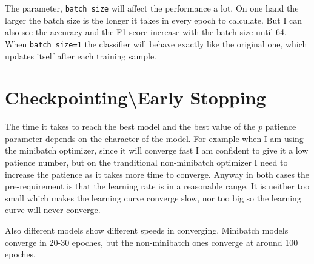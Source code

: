 \documentclass[11pt]{article} %
\begin{document}
The parameter, \verb|batch_size| will affect the performance a lot. On one hand the larger the batch size is the longer it takes in every epoch to calculate. But I can also see the accuracy and the F1-score increase with the batch size until 64. When \verb|batch_size=1| the classifier will behave exactly like the original one, which updates itself after each training sample.

\section{Checkpointing\textbackslash Early Stopping}

The time it takes to reach the best model and the best value of the $p$ patience parameter depends on the character of the model. For example when I am using the minibatch optimizer, since it will converge fast I am confident to give it a low patience number, but on the tranditional non-minibatch optimizer I need to increase the patience as it takes more time to converge. Anyway in both cases the pre-requirement is that the learning rate is in a reasonable range. It is neither too small which makes the learning curve converge slow, nor too big so the learning curve will never converge.

Also different models show different speeds in converging. Minibatch models converge in 20-30 epoches, but the non-minibatch ones converge at around 100 epoches.
\end{document}
